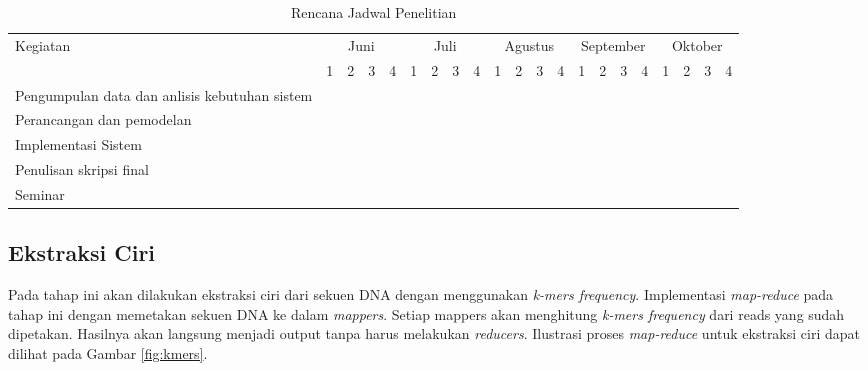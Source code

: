 \begin{table}[t!]
	\begin{center}
		\caption{Rencana Jadwal Penelitian}
		\label{tab:jadwal}
		\footnotesize
		\begin{tabular}{|l|c|c|c|c|c|c|c|c|c|c|c|c|c|c|c|c|c|c|c|c|}
			\hline
			\multirow{2}{*}{Kegiatan}&\multicolumn{4}{c|}{Juni}&\multicolumn{4}{c|}{Juli}&\multicolumn{4}{c|}{Agustus}&\multicolumn{4}{c|}{September}&\multicolumn{4}{c|}{Oktober}\\
			\cline{2-21}
			&1&2&3&4&1&2&3&4&1&2&3&4&1&2&3&4&1&2&3&4\\
			\hline
			Pengumpulan data dan anlisis kebutuhan sistem&\cellcolor{black}&\cellcolor{black}&\cellcolor{black}&&&&&&&&&&&&&&&&&\\
			\hline
			Perancangan dan pemodelan &&&&\cellcolor{black}&\cellcolor{black}&\cellcolor{black}&\cellcolor{black}&\cellcolor{black}&\cellcolor{black}&\cellcolor{black}&\cellcolor{black}&\cellcolor{black}&&&&&&&&\\
			\hline
			Implementasi Sistem&&&&&&&&&\cellcolor{black}&\cellcolor{black}&\cellcolor{black}&\cellcolor{black}&&&&&&&&\\
			\hline
			Penulisan skripsi final&\cellcolor{black}&\cellcolor{black}&\cellcolor{black}&\cellcolor{black}&\cellcolor{black}&\cellcolor{black}&\cellcolor{black}&\cellcolor{black}&\cellcolor{black}&\cellcolor{black}&\cellcolor{black}&\cellcolor{black}&\cellcolor{black}&\cellcolor{black}&\cellcolor{black}&\cellcolor{black}&&&&\\
			\hline
			Seminar&&&&&&&&&&&&&&&&&\cellcolor{black}&&&\\
			\hline
		\end{tabular}
		\normalsize
	\end{center}
\end{table}

\subsection*{Ekstraksi Ciri}
Pada tahap ini akan dilakukan ekstraksi ciri dari sekuen DNA dengan menggunakan \textit{k-mers frequency}.  Implementasi \textit{map-reduce} pada tahap ini dengan memetakan sekuen DNA ke dalam \textit{mappers}. Setiap mappers akan menghitung \textit{k-mers frequency} dari reads yang sudah dipetakan. Hasilnya akan langsung menjadi output tanpa harus melakukan \textit{reducers}. Ilustrasi proses \textit{map-reduce} untuk ekstraksi ciri dapat dilihat pada Gambar \ref{fig:kmers}.

